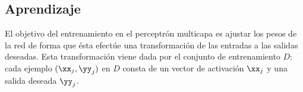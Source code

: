 %
%
\subsection{Aprendizaje}
%



El objetivo del entrenamiento en el perceptrón multicapa es ajustar
los pesos de la red de forma que ésta efectúe una transformación de
las entradas a las salidas deseadas. Esta transformación viene dada
por el conjunto de entrenamiento $D$: cada ejemplo $(\xx_j,\yy_j)$ en
$D$ consta de un vector de activación $\xx_j$ y una salida deseada
$\yy_j$.

